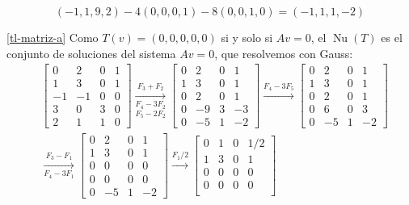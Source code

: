 \begin{enumerate}[topsep=6pt, itemsep=.4cm]
    
    $$(-1,1,9,2) -4(0,0,0,1) -8(0,0,1,0) = (-1,1,1,-2)$$ 

    \ref{tl-matriz-a}  Como $T(v) = (0,0,0,0,0)$ si y solo si $Av=0$, el $\operatorname{Nu}(T)$ es el conjunto de soluciones del sistema $Av=0$,  que resolvemos  con Gauss:
    \begin{align*}
        &\begin{bmatrix}
            0 & 2 & 0 &1\\
            1 & 3 & 0 &1\\
            -1 &-1 &0 &0\\
            3 &0 &3 &0\\
            2 &1 &1 &0
        \end{bmatrix}
        \underset{F_5-2F_2}{\underset{F_4-3F_2}{\stackrel{F_3+F_2}{\longrightarrow}}}
        \begin{bmatrix}
            0 & 2 & 0 &1\\
            1 & 3 & 0 &1\\
            0 &2 &0 &1\\
            0 &-9 &3 &-3\\
            0 &-5 &1 &-2
        \end{bmatrix}
        \stackrel{F_4-3F_5}{\longrightarrow}
        \begin{bmatrix}
            0 & 2 & 0 &1\\
            1 & 3 & 0 &1\\
            0 &2 &0 &1\\
            0 &6 &0 &3\\
            0 &-5 &1 &-2
        \end{bmatrix} \\
        &\underset{F_4-3F_1}{\stackrel{F_3-F_1}{\longrightarrow}}
        \begin{bmatrix}
            0 & 2 & 0 &1\\
            1 & 3 & 0 &1\\
            0 &0 &0 &0\\
            0 &0 &0 &0\\
            0 &-5 &1 &-2
        \end{bmatrix}
        \stackrel{F_1/2}{\longrightarrow}
        \begin{bmatrix}
            0 & 1 & 0 &1/2\\
            1 & 3 & 0 &1\\
            0 &0 &0 &0\\
            0 &0 &0 &0\\

\end{bmatrix}
\end{align*}
\end{enumerate}
